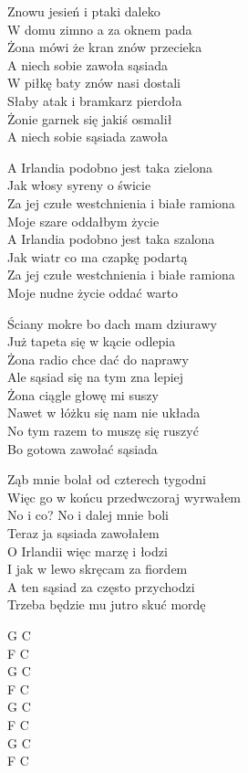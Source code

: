 \begin{text}
    Znowu jesień i ptaki daleko\\
    W domu zimno a za oknem pada\\
    Żona mówi że kran znów przecieka\\
    A niech sobie zawoła sąsiada\\
    W piłkę baty znów nasi dostali\\
    Słaby atak i bramkarz pierdoła\\
    Żonie garnek się jakiś osmalił\\
    A niech sobie sąsiada zawoła

    \vin A Irlandia podobno jest taka zielona\\
    \vin Jak włosy syreny o świcie\\
    \vin Za jej czułe westchnienia i białe ramiona\\
    \vin Moje szare oddałbym życie\\
    \vin A Irlandia podobno jest taka szalona\\
    \vin Jak wiatr co ma czapkę podartą\\
    \vin Za jej czułe westchnienia i białe ramiona\\
    \vin Moje nudne życie oddać warto

    Ściany mokre bo dach mam dziurawy\\
    Już tapeta się w kącie odlepia\\
    Żona radio chce dać do naprawy\\
    Ale sąsiad się na tym zna lepiej\\
    Żona ciągle głowę mi suszy\\
    Nawet w łóżku się nam nie układa\\
    No tym razem to muszę się ruszyć\\
    Bo gotowa zawołać sąsiada

    Ząb mnie bolał od czterech tygodni\\
    Więc go w końcu przedwczoraj wyrwałem\\
    No i co? No i dalej mnie boli\\
    Teraz ja sąsiada zawołałem\\
    O Irlandii więc marzę i łodzi\\
    I jak w lewo skręcam za fiordem\\
    A ten sąsiad za często przychodzi\\
    Trzeba będzie mu jutro skuć mordę
\end{text}
\begin{chord}
    G C\\
    F C\\
    G C\\
    F C\\
    G C\\
    F C\\
    G C\\
    F C
\end{chord}